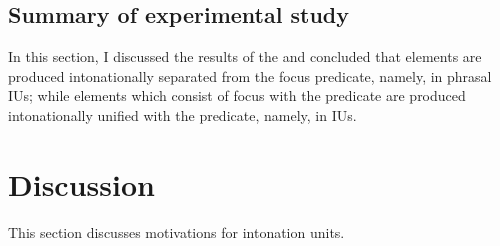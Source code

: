 
\subsection{Summary of experimental study}

In this section,
I discussed the results of the 
and concluded that
 elements are produced intonationally separated from the focus predicate,
namely, in phrasal IUs;
while elements which consist of focus with the predicate are produced intonationally unified with the predicate,
namely, in  IUs.


\section{Discussion}\label{Int:Disc}

This section discusses motivations for intonation units.


